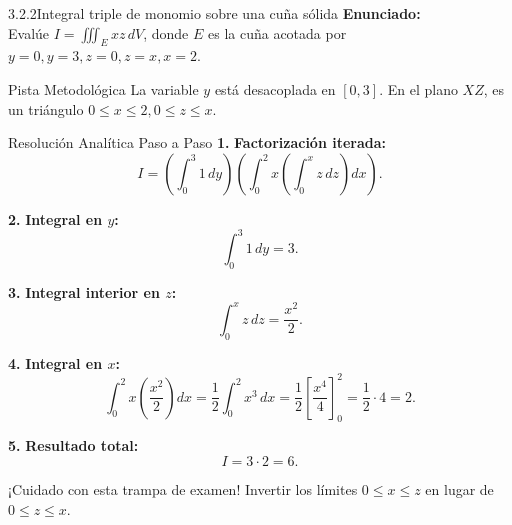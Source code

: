 \documentclass[11pt,a4paper]{article}
\begin{document}
\begin{nivelbox}{3.2.2}{Integral triple de monomio sobre una cuña sólida}
\textbf{Enunciado:}\\
Evalúe $I = \iiint_E x z \, dV$, donde $E$ es la cuña acotada por $y = 0, y = 3, z = 0, z = x, x = 2$.

\begin{observacionbox}{Pista Metodológica}
La variable $y$ está desacoplada en $[0, 3]$. En el plano $XZ$, es un triángulo $0 \le x \le 2, 0 \le z \le x$.
\end{observacionbox}

\begin{ejerciciobox}{Resolución Analítica Paso a Paso}
\smallskip\noindent\textbf{1.} \textbf{Factorización iterada:}
\[I = \left( \int_0^3 1 \, dy \right) \left( \int_0^2 x \left( \int_0^x z \, dz \right) dx \right).\]

\smallskip\noindent\textbf{2.} \textbf{Integral en $y$:}
\[\int_0^3 1 \, dy = 3.\]

\smallskip\noindent\textbf{3.} \textbf{Integral interior en $z$:}
\[\int_0^x z \, dz = \frac{x^2}{2}.\]

\smallskip\noindent\textbf{4.} \textbf{Integral en $x$:}
\[\int_0^2 x \left( \frac{x^2}{2} \right) dx = \frac{1}{2} \int_0^2 x^3 \, dx = \frac{1}{2} \left[ \frac{x^4}{4} \right]_0^2 = \frac{1}{2} \cdot 4 = 2.\]

\smallskip\noindent\textbf{5.} \textbf{Resultado total:}
\[I = 3 \cdot 2 = 6.\]
\end{ejerciciobox}

\begin{errorbox}{¡Cuidado con esta trampa de examen!}
Invertir los límites $0 \le x \le z$ en lugar de $0 \le z \le x$.
\end{errorbox}
\end{nivelbox}
\bigskip
\end{document}

